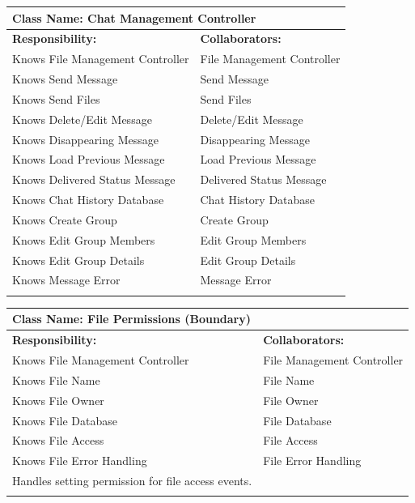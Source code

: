 \documentclass[]{article}
\begin{document}
\begin{itemize}
    	\begin{table}[ht]
		\centering
		\begin{tabular}{|p{7cm}|p{7cm}|}
		\hline 
		\multicolumn{2}{|l|}{\textbf{Class Name:} Chat Management Controller} \\
		\hline
		\textbf{Responsibility:} & \textbf{Collaborators:} \\
		\hline
  			Knows File Management Controller & File Management Controller \\
			Knows Send Message & Send Message \\
			Knows Send Files & Send Files \\
			Knows Delete/Edit Message & Delete/Edit Message \\
			Knows Disappearing Message & Disappearing Message \\
			Knows Load Previous Message & Load Previous Message \\
			Knows Delivered Status Message & Delivered Status Message \\
			Knows Chat History Database & Chat History Database \\
			Knows Create Group & Create Group \\
			Knows Edit Group Members & Edit Group Members \\
			Knows Edit Group Details & Edit Group Details \\
			Knows Message Error & Message Error \\
		\vspace{1in} & \\
		\hline
		\end{tabular}
	\end{table}

    	\begin{table}[ht]
		\centering
		\begin{tabular}{|p{7cm}|p{7cm}|}
		\hline 
		\multicolumn{2}{|l|}{\textbf{Class Name:} File Permissions (Boundary)} \\
		\hline
		\textbf{Responsibility:} & \textbf{Collaborators:} \\
		\hline
  			Knows File Management Controller & File Management Controller \\
			Knows File Name & File Name \\
			Knows File Owner & File Owner \\
			Knows File Database & File Database \\
			Knows File Access & File Access \\
			Knows File Error Handling & File Error Handling \\
			Handles setting permission for file access events. &\\
		\vspace{1in} & \\
		\hline
		\end{tabular}
	\end{table}


\end{itemize}
\end{document}
